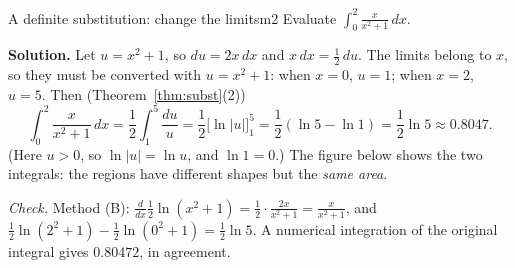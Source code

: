 \documentclass[11pt]{article}
\begin{document}
\begin{exmp}{A definite substitution: change the limits}{m2}
Evaluate $\int_0^2\frac{x}{x^2+1}\,dx$.

\textbf{Solution.} Let $u=x^2+1$, so $du=2x\,dx$ and $x\,dx=\frac12\,du$. The limits belong to $x$, so they must be converted with $u=x^2+1$: when $x=0$, $u=1$; when $x=2$, $u=5$. Then (Theorem~\ref{thm:subst}(2))
\[\int_0^2\frac{x}{x^2+1}\,dx=\frac12\int_1^5\frac{du}{u}=\frac12\Big[\ln\lvert u\rvert\Big]_1^5=\frac12(\ln5-\ln1)=\frac12\ln5\approx0.8047 .\]
(Here $u>0$, so $\ln\lvert u\rvert=\ln u$, and $\ln 1=0$.) The figure below shows the two integrals: the regions have different shapes but the \emph{same area}.

\emph{Check.} Method (B): $\frac{d}{dx}\frac12\ln(x^2+1)=\frac12\cdot\frac{2x}{x^2+1}=\frac{x}{x^2+1}$, and $\frac12\ln(2^2+1)-\frac12\ln(0^2+1)=\frac12\ln5$. A numerical integration of the original integral gives $0.80472$, in agreement.


\end{exmp}
\end{document}
